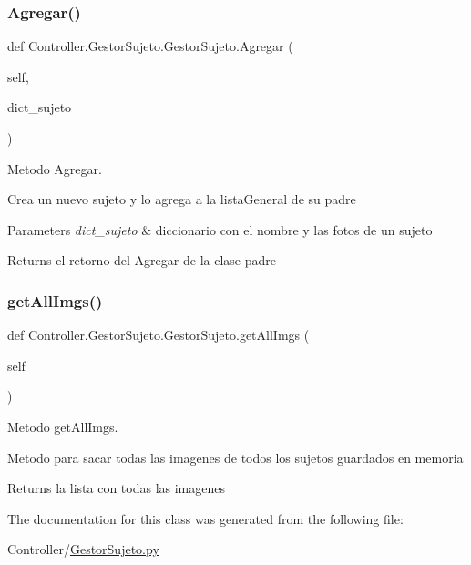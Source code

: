 \subsubsection{\texorpdfstring{Agregar()}{Agregar()}}
{\footnotesize\ttfamily def Controller.\+Gestor\+Sujeto.\+Gestor\+Sujeto.\+Agregar (\begin{DoxyParamCaption}\item[{}]{self,  }\item[{}]{dict\+\_\+sujeto }\end{DoxyParamCaption})}



Metodo Agregar. 

Crea un nuevo sujeto y lo agrega a la lista\+General de su padre 
\begin{DoxyParams}{Parameters}
{\em dict\+\_\+sujeto} & diccionario con el nombre y las fotos de un sujeto \\
\hline
\end{DoxyParams}
\begin{DoxyReturn}{Returns}
el retorno del Agregar de la clase padre 
\end{DoxyReturn}
\mbox{\label{class_controller_1_1_gestor_sujeto_1_1_gestor_sujeto_af5cd0c01af8ad7d3da5f72ac4d9a93cf}} 
\subsubsection{\texorpdfstring{get\+All\+Imgs()}{getAllImgs()}}
{\footnotesize\ttfamily def Controller.\+Gestor\+Sujeto.\+Gestor\+Sujeto.\+get\+All\+Imgs (\begin{DoxyParamCaption}\item[{}]{self }\end{DoxyParamCaption})}



Metodo get\+All\+Imgs. 

Metodo para sacar todas las imagenes de todos los sujetos guardados en memoria \begin{DoxyReturn}{Returns}
la lista con todas las imagenes 
\end{DoxyReturn}


The documentation for this class was generated from the following file\+:\begin{DoxyCompactItemize}
\item 
Controller/\hyperlink{_gestor_sujeto_8py}{Gestor\+Sujeto.\+py}\end{DoxyCompactItemize}
